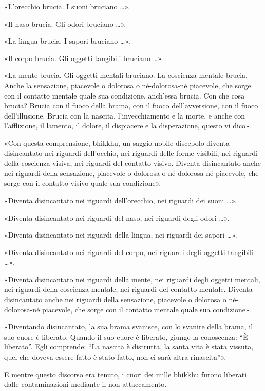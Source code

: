 «L’orecchio brucia. I suoni bruciano …».

«Il naso brucia. Gli odori bruciano …».

«La lingua brucia. I sapori bruciano …».

«Il corpo brucia. Gli oggetti tangibili bruciano …».

«La mente brucia. Gli oggetti mentali bruciano. La coscienza mentale brucia.
Anche la sensazione, piacevole o dolorosa o né-dolorosa-né piacevole, che sorge
con il contatto mentale quale sua condizione, anch’essa brucia. Con che cosa
brucia? Brucia con il fuoco della brama, con il fuoco dell’avversione, con il
fuoco dell’illusione. Brucia con la nascita, l’invecchiamento e la morte, e
anche con l’afflizione, il lamento, il dolore, il dispiacere e la disperazione,
questo vi dico».

«Con questa comprensione, bhikkhu, un saggio nobile discepolo diventa
disincantato nei riguardi dell’occhio, nei riguardi delle forme visibili, nei
riguardi della coscienza visiva, nei riguardi del contatto visivo. Diventa
disincantato anche nei riguardi della sensazione, piacevole o dolorosa o
né-dolorosa-né-piacevole, che sorge con il contatto visivo quale sua
condizione».

«Diventa disincantato nei riguardi dell’orecchio, nei riguardi dei suoni …».

«Diventa disincantato nei riguardi del naso, nei riguardi degli odori …».

«Diventa disincantato nei riguardi della lingua, nei riguardi dei sapori …».

«Diventa disincantato nei riguardi del corpo, nei riguardi degli oggetti
tangibili …».

«Diventa disincantato nei riguardi della mente, nei riguardi degli oggetti
mentali, nei riguardi della coscienza mentale, nei riguardi del contatto
mentale. Diventa disincantato anche nei riguardi della sensazione, piacevole o
dolorosa o né-dolorosa-né piacevole, che sorge con il contatto mentale quale sua
condizione».

«Diventando disincantato, la sua brama svanisce, con lo svanire della brama, il
suo cuore è liberato. Quando il suo cuore è liberato, giunge la conoscenza: “È
liberato”. Egli comprende: “La nascita è distrutta, la santa vita è stata
vissuta, quel che doveva essere fatto è stato fatto, non ci sarà altra
rinascita”».

E mentre questo discorso era tenuto, i cuori dei mille bhikkhu furono liberati
dalle contaminazioni mediante il non-attaccamento.

